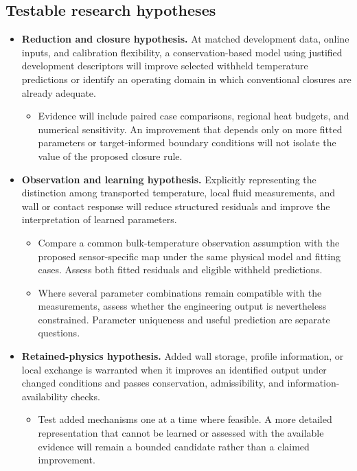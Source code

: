 \subsection{Testable research hypotheses}\label{subsec:testable-research-hypotheses}
\begin{itemize}[leftmargin=*]
\item \textbf{Reduction and closure hypothesis.} At matched development data, online inputs, and calibration flexibility, a conservation-based model using justified development descriptors will improve selected withheld temperature predictions or identify an operating domain in which conventional closures are already adequate.
\begin{itemize}
\item Evidence will include paired case comparisons, regional heat budgets, and numerical sensitivity. An improvement that depends only on more fitted parameters or target-informed boundary conditions will not isolate the value of the proposed closure rule.
\end{itemize}
\item \textbf{Observation and learning hypothesis.} Explicitly representing the distinction among transported temperature, local fluid measurements, and wall or contact response will reduce structured residuals and improve the interpretation of learned parameters.
\begin{itemize}
\item Compare a common bulk-temperature observation assumption with the proposed sensor-specific map under the same physical model and fitting cases. Assess both fitted residuals and eligible withheld predictions.
\item Where several parameter combinations remain compatible with the measurements, assess whether the engineering output is nevertheless constrained. Parameter uniqueness and useful prediction are separate questions.\cite{raue2009identifiability,oliver2014unobserved}
\end{itemize}
\item \textbf{Retained-physics hypothesis.} Added wall storage, profile information, or local exchange is warranted when it improves an identified output under changed conditions and passes conservation, admissibility, and information-availability checks.
\begin{itemize}
\item Test added mechanisms one at a time where feasible. A more detailed representation that cannot be learned or assessed with the available evidence will remain a bounded candidate rather than a claimed improvement.
\end{itemize}
\end{itemize}

